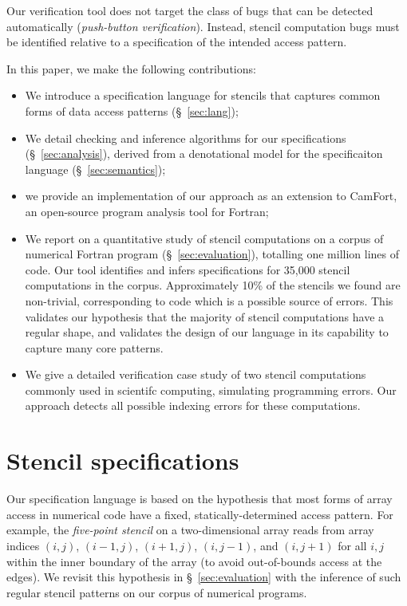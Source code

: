 \documentclass[10pt,preprint]{sigplanconf}
\theoremstyle{definition}
\begin{document}
Our verification tool does not target the
class of bugs that can be detected automatically (\emph{push-button
  verification}). Instead, stencil computation bugs must be
identified relative to a specification of the intended access pattern.

In this paper, we make the following contributions:
%
\begin{itemize}
\item We introduce a specification language for stencils
  that captures common forms of data access patterns
  (\S~\ref{sec:lang});

\item We detail checking and inference algorithms for our
  specifications (\S~\ref{sec:analysis}), derived from a
  denotational model for the specificaiton language
  (\S~\ref{sec:semantics});

\item we provide an implementation of our approach as an extension to
  CamFort, an open-source program analysis tool for Fortran;

\item We report on a quantitative study of stencil computations on a
  corpus of numerical Fortran program
  (\S~\ref{sec:evaluation}), totalling one million lines of code. Our tool
  identifies and infers specifications for 35,000 stencil computations in the
  corpus. Approximately 10\% of the stencils we found are non-trivial,
  corresponding to code which is a possible source of errors. This validates
  our hypothesis that the majority of stencil computations have a regular
  shape, and validates the design of our language in its capability to capture
  many core patterns.

\item We give a detailed verification case study of two
  stencil computations commonly used in scientifc computing,
  simulating programming errors. Our approach detects all
  possible indexing errors for these computations.
\end{itemize}
%

\newcommand{\domainVal}{\mathbb{Z}_\infty}
\section{Stencil specifications}

Our specification language is based on the hypothesis
that most forms of array access in numerical code have
a fixed, statically-determined access pattern. For example, the
\emph{five-point stencil} on a two-dimensional array reads from array
indices $(i, j)$, $(i-1, j)$, $(i+1, j)$, $(i, j-1)$, and $(i, j+1)$
for all $i, j$ within the inner boundary of the array (to avoid
out-of-bounds access at the edges). We revisit this hypothesis
in \S~\ref{sec:evaluation} with the inference of
such regular stencil patterns on our corpus of numerical programs.
\end{document}
